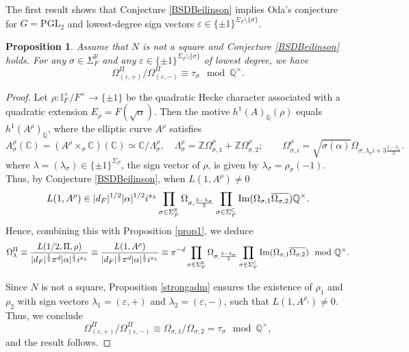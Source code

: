 \documentclass{amsart}
\newtheorem{proposition}[theorem]{Proposition}
\theoremstyle{definition}
\theoremstyle{remark}
\numberwithin{equation}{section}
\newcommand{\PGL}{{\mathrm{PGL}}}
\newcommand{\Z}{{\mathbb Z}}
\newcommand{\Q}{{\mathbb Q}}
\newcommand{\C}{{\mathbb C}}
\newcommand{\R}{{\mathbb R}}
\newcommand{\I}{{\mathbb I}}
\begin{document}
The first result shows that Conjecture \eqref{BSDBeilinson} implies Oda's conjecture for $G=\PGL_2$ and lowest-degree sign vectors $\varepsilon\in\{\pm 1\}^{\Sigma_F\setminus\{\sigma\}}$.

\begin{proposition}\label{Oda1}
Assume that $N$ is not a square and  Conjecture \eqref{BSDBeilinson} holds. For any $\sigma\in\Sigma_F^\R$ and any $\varepsilon\in\{\pm 1\}^{\Sigma_F\setminus\{\sigma\}}$ of lowest degree, we have 
\[
 \Omega_{(\varepsilon,+)}^\Pi/\Omega_{(\varepsilon,-)}^\Pi\equiv \tau_\sigma\mod\Q^\times.
\]
\end{proposition} 
\begin{proof}
Let $\rho:\I_F^\times/F^\times\rightarrow \{\pm 1\}$ be the quadratic Hecke character associated with a quadratic extension $E_\rho=F(\sqrt{\alpha})$. Then the motive $h^1(A)_\Q(\rho)$ equals $h^1(A^\rho)_\Q$, where the elliptic curve $A^\rho$ satisfies
\[
A^\rho_\sigma(\C)=(A^\rho\times_\sigma\C)(\C)\simeq\C/\Lambda_\sigma^\rho,\quad \Lambda_\sigma^\rho=\Z\Omega_{\sigma,1}^\rho+\Z\Omega_{\sigma,2}^\rho;\qquad \Omega^\rho_{\sigma,i}=\sqrt{\sigma(\alpha)}\Omega_{\sigma,\lambda_\sigma i+3\frac{1-\lambda_\sigma}{2}}.
\]
where $\lambda=(\lambda_\sigma)\in \{\pm 1\}^{\Sigma_F}$, the sign vector of $\rho$, is given by $\lambda_\sigma=\rho_\sigma(-1)$. Thus,  by Conjecture  \ref{BSDBeilinson}, when $L(1,A^\rho)\neq0$
    \begin{equation*}\label{resultBSD}
    L(1,A^\rho)\in |d_F|^{1/2}|\alpha|^{1/2}i^{s_\lambda}\prod_{\sigma\in\Sigma_F^\R}\Omega_{\sigma,\frac{3-\lambda_\sigma}{2}}\prod_{\sigma\in\Sigma_F^\C}{\rm Im}(\Omega_{\sigma,1}\overline{\Omega_{\sigma,2}})\Q^\times.
    \end{equation*}
Hence, combining this with Proposition \ref{prop1}, we deduce
\begin{equation}\label{relOmegaOmega}
  \Omega_\lambda^\Pi\equiv\frac{L(1/2,\Pi,\rho)}{|d_F|^{\frac{1}{2}}\pi^{d}|\alpha|^{\frac{1}{2}}i^{s_\lambda}}\equiv\frac{L(1,A^\rho)}{|d_F|^{\frac{1}{2}}\pi^{d}|\alpha|^{\frac{1}{2}}i^{s_\lambda}}\equiv\pi^{-d}\prod_{\sigma\in\Sigma_F^\R}\Omega_{\sigma,\frac{3-\lambda_\sigma}{2}}\prod_{\sigma\in\Sigma_F^\C}{\rm Im}(\Omega_{\sigma,1}\overline{\Omega_{\sigma,2}})\mod\Q^\times.
\end{equation}

Since $N$ is not a square, Proposition \ref{strongadm} ensures the existence of $\rho_1$ and $\rho_2$ with sign vectors $\lambda_1=(\varepsilon,+)$ and $\lambda_2=(\varepsilon,-)$, such that $L(1,A^{\rho_i})\neq0$. Thus, we conclude
\begin{equation*}\label{OdasupBSD}
    \Omega_{(\varepsilon,+)}^\Pi/\Omega_{(\varepsilon,-)}^\Pi\equiv\Omega_{\sigma, 1}/\Omega_{\sigma, 2}=\tau_\sigma\mod\Q^\times,
\end{equation*}
and the result follows. 
\end{proof}
\end{document}
